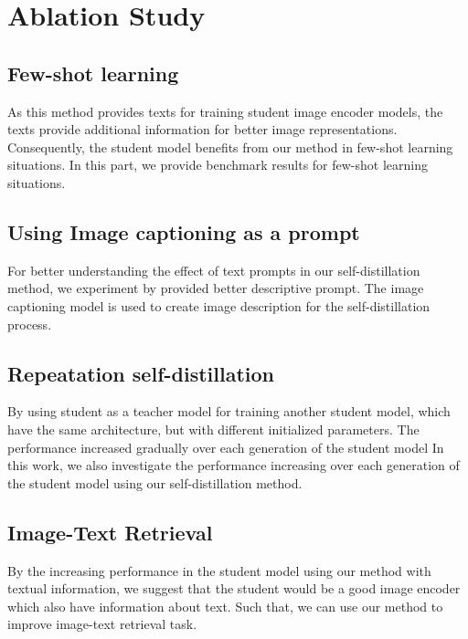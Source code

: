 \section{Ablation Study}
\subsection{Few-shot learning}
As this method provides texts for training student image encoder models, the texts provide additional information for better image representations.
Consequently, the student model benefits from our method in few-shot learning situations.
In this part, we provide benchmark results for few-shot learning situations.

\subsection{Using Image captioning as a prompt}
For better understanding the effect of text prompts in our self-distillation method, we experiment by provided better descriptive prompt.
The image captioning model is used to create image description for the self-distillation process.

\subsection{Repeatation self-distillation}
By using student as a teacher model for training another student model, which have the same architecture, but with different initialized parameters.
The performance increased gradually over each generation of the student model 
In this work, we also investigate the performance increasing over each generation of the student model using our self-distillation method.

\subsection{Image-Text Retrieval}
By the increasing performance in the student model using our method with textual information, we suggest that the student would be a good image encoder which also have information about text.
Such that, we can use our method to improve image-text retrieval task.


